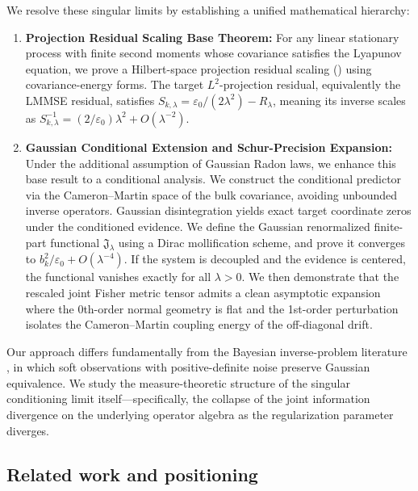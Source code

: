 \documentclass[11pt]{amsart}
\theoremstyle{plain}
\theoremstyle{definition}
\theoremstyle{remark}
\begin{document}
We resolve these singular limits by establishing a unified mathematical hierarchy:
\begin{enumerate}
  \item \textbf{Projection Residual Scaling Base Theorem:} For any linear stationary process with finite second moments whose covariance satisfies the Lyapunov equation, we prove a Hilbert-space projection residual scaling () using covariance-energy forms. The target $L^2$-projection residual, equivalently the LMMSE residual, satisfies $S_{k,\lambda} = \varepsilon_0/(2\lambda^2) - R_\lambda$, meaning its inverse scales as $S_{k,\lambda}^{-1} = (2/\varepsilon_0)\lambda^2 + O(\lambda^{-2})$.
  \item \textbf{Gaussian Conditional Extension and Schur-Precision Expansion:} Under the additional assumption of Gaussian Radon laws, we enhance this base result to a conditional analysis. We construct the conditional predictor via the Cameron--Martin space of the bulk covariance, avoiding unbounded inverse operators. Gaussian disintegration yields exact target coordinate zeros under the conditioned evidence. We define the Gaussian renormalized finite-part functional $\mathfrak{J}_\lambda$ using a Dirac mollification scheme, and prove it converges to $b_k^2/\varepsilon_0 + O(\lambda^{-4})$. If the system is decoupled and the evidence is centered, the functional vanishes exactly for all $\lambda > 0$. We then demonstrate that the rescaled joint Fisher metric tensor admits a clean asymptotic expansion where the 0th-order normal geometry is flat and the 1st-order perturbation isolates the Cameron--Martin coupling energy of the off-diagonal drift.
\end{enumerate}

Our approach differs fundamentally from the Bayesian inverse-problem literature \cite{stuart2010inverse}, in which soft observations with positive-definite noise preserve Gaussian equivalence. We study the measure-theoretic structure of the singular conditioning limit itself---specifically, the collapse of the joint information divergence on the underlying operator algebra as the regularization parameter diverges.

\subsection{Related work and positioning}
\label{sec:related}
\end{document}
